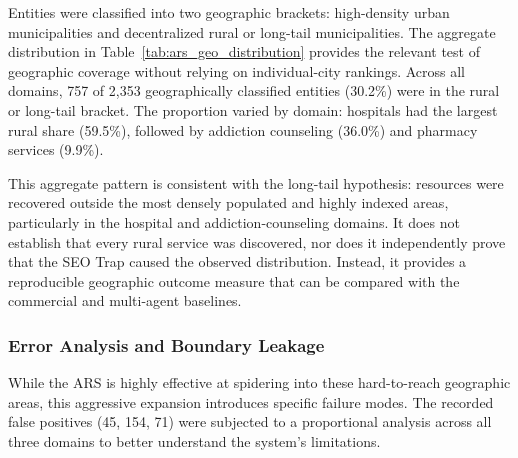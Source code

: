 \documentclass[12pt,oneside]{report}
\begin{document}
Entities were classified into two geographic brackets: high-density urban municipalities and decentralized rural or long-tail municipalities. The aggregate distribution in Table~\ref{tab:ars_geo_distribution} provides the relevant test of geographic coverage without relying on individual-city rankings. Across all domains, 757 of 2,353 geographically classified entities (30.2\%) were in the rural or long-tail bracket. The proportion varied by domain: hospitals had the largest rural share (59.5\%), followed by addiction counseling (36.0\%) and pharmacy services (9.9\%).

This aggregate pattern is consistent with the long-tail hypothesis: resources were recovered outside the most densely populated and highly indexed areas, particularly in the hospital and addiction-counseling domains. It does not establish that every rural service was discovered, nor does it independently prove that the SEO Trap caused the observed distribution. Instead, it provides a reproducible geographic outcome measure that can be compared with the commercial and multi-agent baselines.

\subsubsection{Error Analysis and Boundary Leakage}
While the ARS is highly effective at spidering into these hard-to-reach geographic areas, this aggressive expansion introduces specific failure modes. The recorded false positives (45, 154, 71) were subjected to a proportional analysis across all three domains to better understand the system's limitations.
\end{document}
